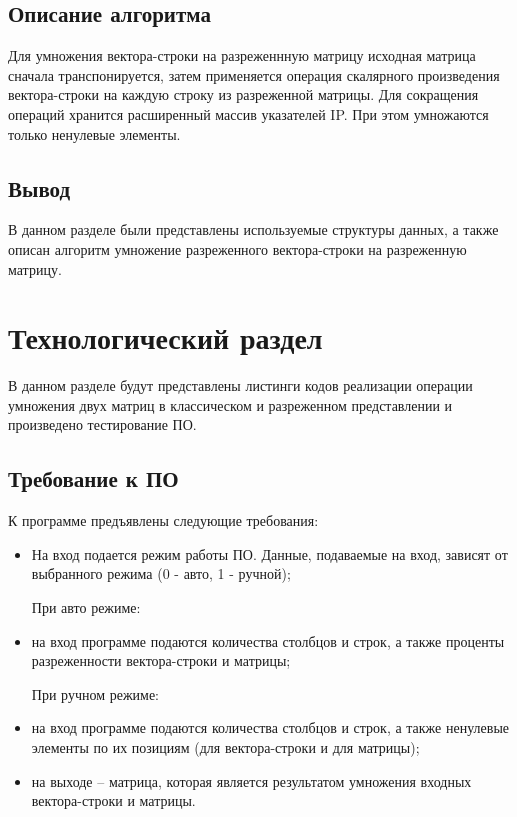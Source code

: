 \section{Описание алгоритма}

Для умножения вектора-строки на разреженнную матрицу исходная матрица сначала транспонируется, затем применяется операция скалярного произведения вектора-строки на каждую строку из разреженной матрицы. Для сокращения операций хранится расширенный массив указателей IP. При этом умножаются только ненулевые элементы.

\section{Вывод}

В данном разделе были представлены используемые структуры данных, а также описан алгоритм умножение разреженного вектора-строки на разреженную матрицу.


\chapter{Технологический раздел}

В данном разделе будут представлены листинги кодов реализации операции умножения двух матриц в классическом и разреженном представлении и произведено тестирование ПО.

\section{Требование к ПО}

К программе предъявлены следующие требования:

\begin{itemize}[$\bullet$]
	\item На вход подается режим работы ПО. Данные, подаваемые на вход, зависят от выбранного режима (0 - авто, 1 - ручной);
	
	При авто режиме:
	
	\item на вход программе подаются количества столбцов и строк, а также проценты разреженности вектора-строки и матрицы;
	
	При ручном режиме:
	
	\item на вход программе подаются количества столбцов и строк, а также ненулевые элементы по их позициям (для вектора-строки и для матрицы);
	\item на выходе -- матрица, которая является результатом умножения входных вектора-строки и матрицы.
\end{itemize}


